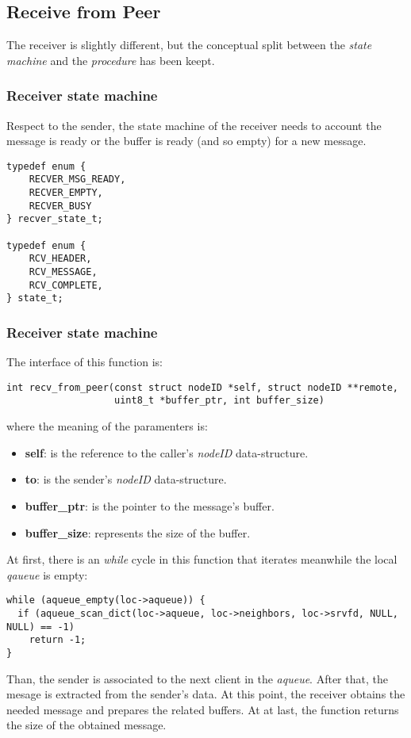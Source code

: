 \subsection{Receive from Peer}
The receiver is slightly different, but the conceptual split between the \textit{state machine} and the
\textit{procedure} has been keept.

\subsubsection{Receiver state machine}
Respect to the sender, the state machine of the receiver needs to account the message is ready or the
buffer is ready (and so empty) for a new message.
\begin{lstlisting}
typedef enum {
    RECVER_MSG_READY,
    RECVER_EMPTY,
    RECVER_BUSY
} recver_state_t;

typedef enum {
    RCV_HEADER,
    RCV_MESSAGE,
    RCV_COMPLETE,
} state_t;
\end{lstlisting}

\subsubsection{Receiver state machine}
The interface of this function is:
\begin{lstlisting}
int recv_from_peer(const struct nodeID *self, struct nodeID **remote,
                   uint8_t *buffer_ptr, int buffer_size)
\end{lstlisting}
where the meaning of the paramenters is:
\begin{itemize}
  \item \textbf{self}: is the reference to the caller's \textit{nodeID} data-structure.
  \item \textbf{to}: is the sender's \textit{nodeID} data-structure.
  \item \textbf{buffer\_ptr}: is the pointer to the message's buffer.
  \item \textbf{buffer\_size}: represents the size of the buffer.
\end{itemize}
At first, there is an \textit{while} cycle in this function that iterates meanwhile the local
\textit{qaueue} is empty:
\begin{lstlisting}
while (aqueue_empty(loc->aqueue)) {
  if (aqueue_scan_dict(loc->aqueue, loc->neighbors, loc->srvfd, NULL, NULL) == -1)
    return -1;
}
\end{lstlisting}
Than, the sender is associated to the next client in the \textit{aqueue}. After that, the mesage is extracted
from the sender's data. At this point, the receiver obtains the needed message and prepares the
related buffers. At at last, the function returns the size of the obtained message.

